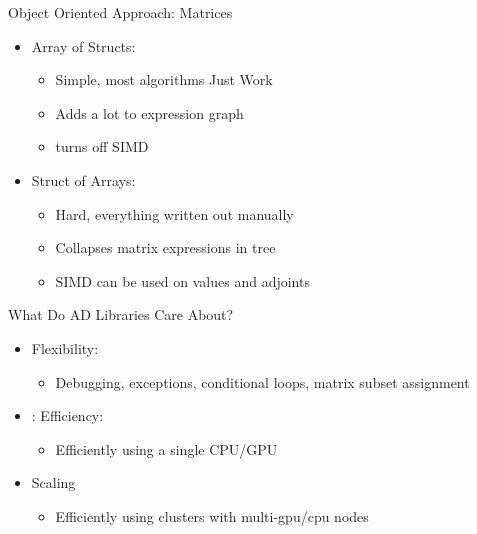 \documentclass[dvipsnames]{beamer}
\begin{document}
\begin{frame}{Object Oriented Approach: Matrices}
\begin{itemize}
    \item Array of Structs:
    \begin{itemize}
        \item Simple, most algorithms Just Work\texttrademark
        \item Adds a lot to expression graph
        \item turns off SIMD
    \end{itemize}
    \item Struct of Arrays:
    \begin{itemize}
        \item Hard, everything written out manually
        \item Collapses matrix expressions in tree
        \item SIMD can be used on values and adjoints
    \end{itemize}
\end{itemize}
\end{frame}

\begin{frame}{What Do AD Libraries Care About?}
    \begin{itemize}
        \item Flexibility:
         \begin{itemize}
             \item Debugging, exceptions, conditional loops, matrix subset assignment
         \end{itemize}
         \item: Efficiency:
         \begin{itemize}
             \item Efficiently using a single CPU/GPU
         \end{itemize}
         \item Scaling
         \begin{itemize}
             \item Efficiently using clusters with multi-gpu/cpu nodes
         \end{itemize}
    \end{itemize}
\end{frame}
\end{document}
